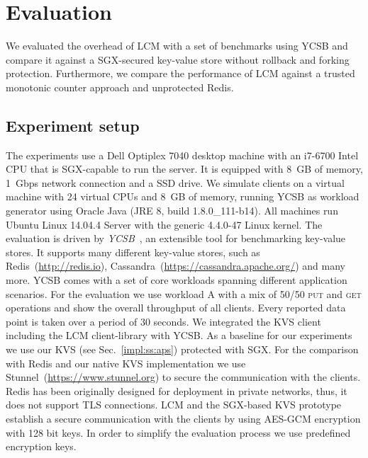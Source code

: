 \documentclass[11pt]{article}
\theoremstyle{plain-boldhead}
\theoremstyle{definition-boldhead}
\newcommand{\str}[1]{\textsc{#1}}
\newcommand{\pp}{LCM\xspace}
\begin{document}
\section{Evaluation}\label{sec:eval}

We evaluated the overhead of \pp with a set of benchmarks using YCSB and
compare it against a \ac{SGX}-secured key-value store without
rollback and forking protection.  Furthermore, we compare the performance of \pp
against a trusted monotonic counter approach and unprotected Redis.


\subsection{Experiment setup}

The experiments use a Dell Optiplex 7040 desktop machine with an i7-6700
Intel CPU that is SGX-capable to run the server.  It is equipped with 8~GB of
memory, 1~Gbps network connection and a SSD drive. 
% 
We simulate clients on a virtual machine with 24 virtual CPUs and 8~GB of
memory, running YCSB as workload generator using Oracle Java (JRE 8, build
1.8.0\_111-b14).
% 
All machines run Ubuntu Linux 14.04.4 Server with the generic 4.4.0-47 Linux
kernel.
% 
The evaluation is driven by \emph{YCSB}~\cite{ycsb}, an extensible tool for
benchmarking key-value stores. It supports many different key-value stores,
such as Redis~(\url{http://redis.io}),
Cassandra~(\url{https://cassandra.apache.org/}) and many more. YCSB
comes with a set of core workloads spanning different application scenarios.
For the evaluation we use workload A with a mix of 50/50 \str{put} and
\str{get} operations and show the overall throughput of all clients.  Every
reported data point is taken over a period of 30 seconds.
% 
We integrated the KVS client including the \pp client-library with YCSB.
% 
As a baseline for our experiments we use our KVS (see Sec.~\ref{impl:ss:aps}) 
protected with \ac{SGX}.
% 
For the comparison with Redis and our native KVS implementation we use
Stunnel~(\url{https://www.stunnel.org}) to secure the communication
with the clients.  Redis has been originally designed for deployment in
private networks, thus, it does not support TLS connections.
% 
\pp and the \ac{SGX}-based KVS prototype establish a secure communication with the
clients by using AES-GCM encryption with 128 bit keys.  In order to simplify
the evaluation process we use predefined encryption keys.
\end{document}
